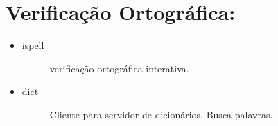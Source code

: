 \documentclass[a4paper,10pt,brazil]{sphinxmanual}
\begin{document}
\section{Verificação Ortográfica:}
\label{unix:verificacao-ortografica}\begin{itemize}
\item {} \begin{description}
\item[{ispell}] \leavevmode
verificação ortográfica interativa.

\end{description}

\item {} \begin{description}
\item[{dict}] \leavevmode
Cliente para servidor de dicionários. Busca palavras.

\end{description}

\end{itemize}
\end{document}
